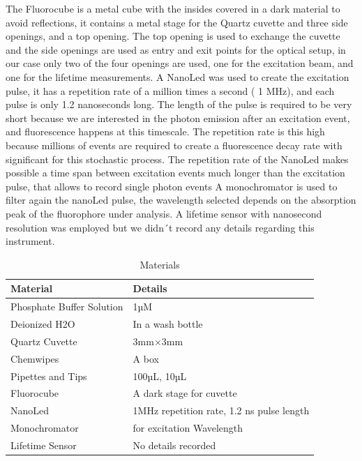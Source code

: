 \documentclass[a4paper,english,12pt,bibliography=totoc]{scrreprt}
\begin{document}
The Fluorocube is a metal cube with the insides covered in a dark material to avoid reflections, it contains a metal stage for the Quartz cuvette and three side openings, and a top opening. The top opening is used to exchange the cuvette and the side openings are used as entry and exit points for the optical setup, in our case only two of the four openings are used, one for the excitation beam, and one for the lifetime measurements.
A NanoLed was used to create the excitation pulse, it has a repetition rate of a million times a second ( 1 MHz), and each pulse is only 1.2 nanoseconds long. The length of the pulse is required to be very short because we are interested in the photon emission after an excitation event, and fluorescence happens at this timescale. The repetition rate is this high because millions of events are required to create a fluorescence decay rate with significant for this stochastic process. 
The repetition rate of the NanoLed makes possible a time span between excitation events much longer than the excitation pulse, that allows to record single photon events
A monochromator is used to filter again the nanoLed pulse, the wavelength selected depends on the absorption peak of the fluorophore under analysis.
A lifetime sensor with nanosecond resolution was employed but we didn´t record any details regarding this instrument.

\begin{table}[htbp]
    \centering
    \begin{tabular}{|>{\raggedright}p{5cm}|p{7cm}|}
        \hline
        \textbf{Material} & \textbf{Details} \\
        \hline
        Phosphate Buffer Solution &  1µM \\
        \hline
        Deionized H2O &  In a wash bottle \\ 
        \hline
        Quartz Cuvette & 3mm$\times$3mm \\
        \hline
        Chemwipes & A box \\
        \hline
        Pipettes and Tips & 100µL, 10µL \\
        \hline
        Fluorocube & A dark stage for cuvette \\
        \hline
        NanoLed & 1MHz repetition rate, 1.2 ns pulse length \\
        \hline
        Monochromator & for excitation Wavelength \\
        \hline
        Lifetime Sensor & No details recorded \\
        \hline
        
    \end{tabular}
    \caption{Materials}
    \label{tab:materials_details}
\end{table}
\end{document}

